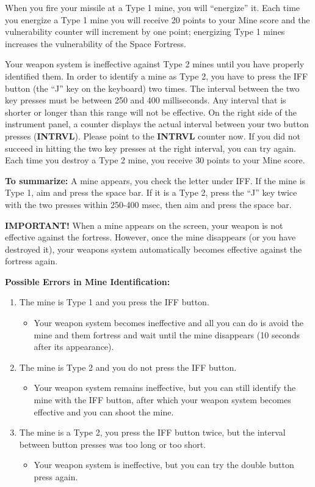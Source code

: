 \documentclass[letterpaper,12pt]{article}
\begin{document}
When you fire your missile at a Type 1 mine, you will ``energize'' it. Each time you energize a Type
1 mine you will receive 20 points to your Mine score and the vulnerability counter will increment by
one point; energizing Type 1 mines increases the vulnerability of the Space Fortress.

Your weapon system is ineffective against Type 2 mines until you have properly identified them. In
order to identify a mine as Type 2, you have to press the IFF button (the “J” key on the keyboard)
two times. The interval between the two key presses must be between 250 and 400 milliseconds. Any
interval that is shorter or longer than this range will not be effective. On the right side of the
instrument panel, a counter displays the actual interval between your two button presses
(\textbf{INTRVL}). Please point to the \textbf{INTRVL} counter now. If you did not succeed in
hitting the two key presses at the right interval, you can try again. Each time you destroy a Type 2
mine, you receive 30 points to your Mine score.

\textbf{To summarize:} A mine appears, you check the letter under IFF. If the mine is Type 1, aim
and press the space bar. If it is a Type 2, press the ``J'' key twice with the two presses within
250-400 msec, then aim and press the space bar.

\textbf{IMPORTANT!} When a mine appears on the screen, your weapon is not effective against
the fortress. However, once the mine disappears (or you have destroyed it), your weapons system
automatically becomes effective against the fortress again.

\textbf{Possible Errors in Mine Identification:}
\begin{enumerate}
\item The mine is Type 1 and you press the IFF button.
\begin{itemize}
\item Your weapon system becomes ineffective and all you can do is avoid the mine and them fortress
and wait until the mine disappears (10 seconds after its appearance).
\end{itemize}
\item The mine is Type 2 and you do not press the IFF button.
\begin{itemize}
\item Your weapon system remains ineffective, but you can still identify the mine with the IFF
button, after which your weapon system becomes effective and you can shoot the mine.
\end{itemize}
\item The mine is a Type 2, you press the IFF button twice, but the interval between button presses
was too long or too short.
\begin{itemize}
\item Your weapon system is ineffective, but you can try the double button press again.
\end{itemize}

\end{enumerate}
\end{document}
